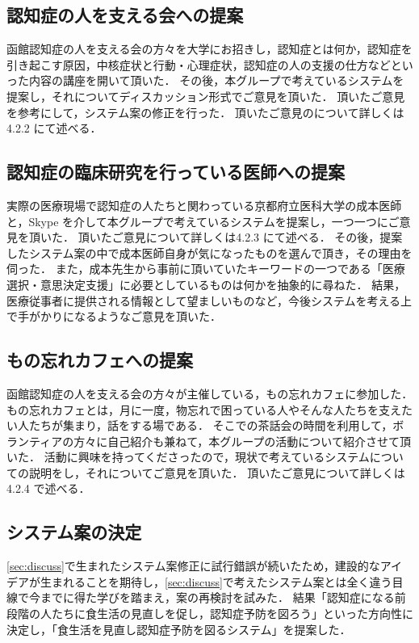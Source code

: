 \documentclass[../report]{subfiles}
\begin{document}
\subsection{認知症の人を支える会への提案}
函館認知症の人を支える会の方々を大学にお招きし，認知症とは何か，認知症を引き起こす原因，中核症状と行動・心理症状，認知症の人の支援の仕方などといった内容の講座を開いて頂いた．
その後，本グループで考えているシステムを提案し，それについてディスカッション形式でご意見を頂いた．
頂いたご意見を参考にして，システム案の修正を行った．
頂いたご意見のについて詳しくは4.2.2 にて述べる．

\subsection{認知症の臨床研究を行っている医師への提案}
実際の医療現場で認知症の人たちと関わっている京都府立医科大学の成本医師と，Skype を介して本グループで考えているシステムを提案し，一つ一つにご意見を頂いた．
頂いたご意見について詳しくは4.2.3 にて述べる．
その後，提案したシステム案の中で成本医師自身が気になったものを選んで頂き，その理由を伺った．
また，成本先生から事前に頂いていたキーワードの一つである「医療選択・意思決定支援」に必要としているものは何かを抽象的に尋ねた．
結果，医療従事者に提供される情報として望ましいものなど，今後システムを考える上で手がかりになるようなご意見を頂いた．

\subsection{もの忘れカフェへの提案} \label{sec:propose_cafe}
函館認知症の人を支える会の方々が主催している，もの忘れカフェに参加した．
もの忘れカフェとは，月に一度，物忘れで困っている人やそんな人たちを支えたい人たちが集まり，話をする場である．
そこでの茶話会の時間を利用して，ボランティアの方々に自己紹介も兼ねて，本グループの活動について紹介させて頂いた．
活動に興味を持ってくださったので，現状で考えているシステムについての説明をし，それについてご意見を頂いた．
頂いたご意見について詳しくは4.2.4 で述べる．

\subsection{システム案の決定} \label{sec:decision}
\ref{sec:discuss}で生まれたシステム案修正に試行錯誤が続いたため，建設的なアイデアが生まれることを期待し，\ref{sec:discuss}で考えたシステム案とは全く違う目線で今までに得た学びを踏まえ，案の再検討を試みた．
結果「認知症になる前段階の人たちに食生活の見直しを促し，認知症予防を図ろう」といった方向性に決定し，「食生活を見直し認知症予防を図るシステム」を提案した．
\end{document}
